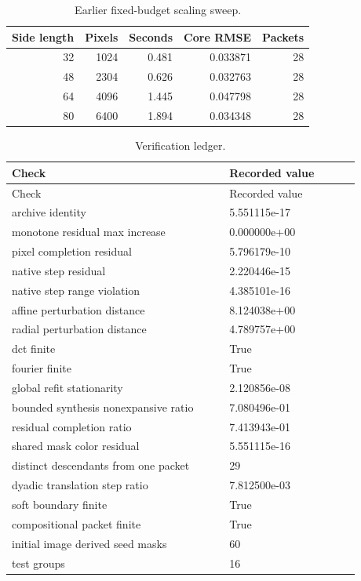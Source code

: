 \begin{table}[H]\centering
\caption{Earlier fixed-budget scaling sweep.}\label{tab:scaling}
\small\begin{tabular}{rrrrr}\toprule Side length & Pixels & Seconds & Core RMSE & Packets\\\midrule
32 & 1024 & 0.481 & 0.033871 & 28\\
48 & 2304 & 0.626 & 0.032763 & 28\\
64 & 4096 & 1.445 & 0.047798 & 28\\
80 & 6400 & 1.894 & 0.034348 & 28\\
\bottomrule\end{tabular}\end{table}

\begin{longtable}{L{0.55\linewidth}L{0.33\linewidth}}
\caption{Verification ledger.}\label{tab:tests}\\
\toprule Check & Recorded value\\\midrule
\endfirsthead\toprule Check & Recorded value\\\midrule\endhead
archive identity & 5.551115e-17\\
monotone residual max increase & 0.000000e+00\\
pixel completion residual & 5.796179e-10\\
native step residual & 2.220446e-15\\
native step range violation & 4.385101e-16\\
affine perturbation distance & 8.124038e+00\\
radial perturbation distance & 4.789757e+00\\
dct finite & True\\
fourier finite & True\\
global refit stationarity & 2.120856e-08\\
bounded synthesis nonexpansive ratio & 7.080496e-01\\
residual completion ratio & 7.413943e-01\\
shared mask color residual & 5.551115e-16\\
distinct descendants from one packet & 29\\
dyadic translation step ratio & 7.812500e-03\\
soft boundary finite & True\\
compositional packet finite & True\\
initial image derived seed masks & 60\\
test groups & 16\\
\bottomrule\end{longtable}

